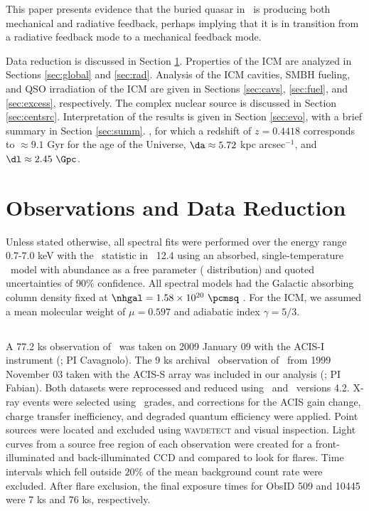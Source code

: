 \documentclass[useAMS,usenatbib]{mn2e}
\begin{document}
This paper presents evidence that the buried quasar in \irs\ is
producing both mechanical and radiative feedback, perhaps implying
that it is in transition from a radiative feedback mode to a
mechanical feedback mode.

Data reduction is discussed in Section
\ref{sec:obs}. Properties of the ICM are analyzed in Sections
\ref{sec:global} and \ref{sec:rad}. Analysis of the ICM cavities, SMBH
fueling, and QSO irradiation of the ICM are given in Sections
\ref{sec:cavs}, \ref{sec:fuel}, and \ref{sec:excess},
respectively. The complex nuclear source is discussed in Section
\ref{sec:centsrc}. Interpretation of the results is given in Section
\ref{sec:evo}, with a brief summary in Section \ref{sec:summ}. \LCDM,
for which a redshift of $z = 0.4418$ corresponds to $\approx 9.1$ Gyr
for the age of the Universe, $\da \approx 5.72$ kpc arcsec$^{-1}$, and
$\dl \approx 2.45~\Gpc$.

\section{Observations and Data Reduction}
\label{sec:obs}

Unless stated otherwise, all spectral fits were performed over the
energy range 0.7-7.0 keV with the \chisq\ statistic in \xspec\ 12.4
\citep{xspec} using an absorbed, single-temperature \mekal\ model
\citep{mekal1} with abundance as a free parameter (\citealt{ag89}
distribution) and quoted uncertainties of 90\% confidence. All
spectral models had the Galactic absorbing column density fixed at
$\nhgal = 1.58 \times 10^{20} ~\pcmsq$ \citep{lab}. For the ICM, we
assumed a mean molecular weight of $\mu = 0.597$ and adiabatic index
$\gamma = 5/3$.

\subsection{\chandra}
\label{sec:xray}

A 77.2 ks observation of \irs\ was taken on 2009 January 09 with the
ACIS-I instrument (; PI
Cavagnolo). The 9 ks archival \chandra\ observation of \irs\ from 1999
November 03 taken with the ACIS-S array was included in our analysis
(; PI Fabian). Both
datasets were reprocessed and reduced using \ciao\ and
\caldb\ versions 4.2. X-ray events were selected using \asca\ grades,
and corrections for the ACIS gain change, charge transfer
inefficiency, and degraded quantum efficiency were applied. Point
sources were located and excluded using {\textsc{wavdetect}} and
visual inspection. Light curves from a source free region of each
observation were created for a front-illuminated and back-illuminated
CCD and compared to look for flares. Time intervals which fell outside
$20\%$ of the mean background count rate were excluded. After flare
exclusion, the final exposure times for ObsID 509 and 10445 were 7 ks
and 76 ks, respectively.
\end{document}
